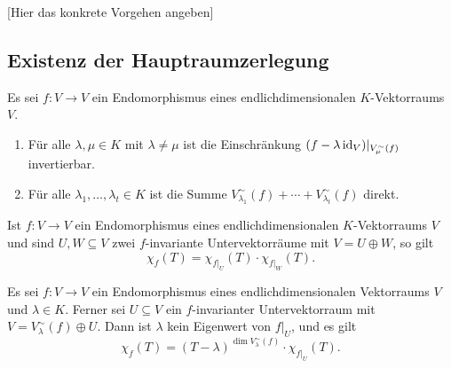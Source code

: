 [Hier das konkrete Vorgehen angeben]










\subsection{Existenz der Hauptraumzerlegung}


\begin{lemma}
  Es sei $f \colon V \to V$ ein Endomorphismus eines endlichdimensionalen $K$-Vek\-tor\-raums $V$.
  \begin{enumerate}[leftmargin=*, label=\roman*)]
    \item
      Für alle $\lambda, \mu \in K$ mit $\lambda \neq \mu$ ist die Einschränkung $(f - \lambda \operatorname{id}_V)|_{V^\sim_\mu(f)}$  invertierbar.
    \item
      Für alle $\lambda_1, \dotsc, \lambda_t \in K$ ist die Summe $V^\sim_{\lambda_1}(f) + \dotsb + V^\sim_{\lambda_t}(f)$ direkt.
  \end{enumerate}
\end{lemma}


\begin{lemma}
  Ist $f \colon V \to V$ ein Endomorphismus eines endlichdimensionalen $K$-Vek\-tor\-raums $V$ und sind $U, W \subseteq V$ zwei $f$-invariante Untervektorräume mit $V = U \oplus W$, so gilt
  \[
    \chi_f(T) = \chi_{f|_U}(T) \cdot \chi_{f|_W}(T).
  \]
\end{lemma}


\begin{lemma}\label{lem: finding direct summands to generalized eigenspaces}
  Es sei $f \colon V \to V$ ein Endomorphismus eines endlichdimensionalen Vektorraums $V$ und $\lambda \in K$.
  Ferner sei $U \subseteq V$ ein $f$-invarianter Untervektorraum mit $V = V^\sim_\lambda(f) \oplus U$.
  Dann ist $\lambda$ kein Eigenwert von $f|_U$, und es gilt
  \[
    \chi_f(T) = (T-\lambda)^{\dim V^\sim_\lambda(f)} \cdot \chi_{f|_U}(T).
  \]
\end{lemma}



